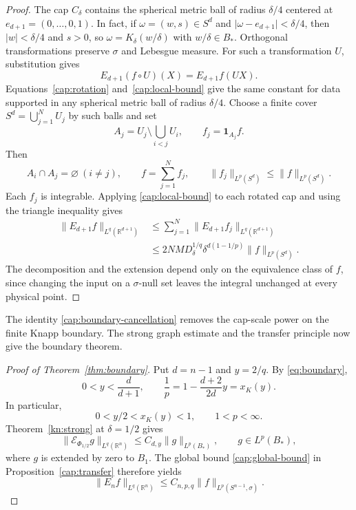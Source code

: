 \documentclass[11pt]{article}
\numberwithin{equation}{section}
\newcommand{\R}{\mathbb{R}}
\newcommand{\norm}[1]{\lVert #1\rVert}
\newcommand{\abs}[1]{\lvert #1\rvert}
\begin{document}
\begin{proof}
The cap $C_\delta$ contains the spherical metric ball of radius
$\delta/4$ centered at $e_{d+1}=(0,\ldots,0,1)$. In fact, if
$\omega=(w,s)\in S^d$ and $\abs{\omega-e_{d+1}}<\delta/4$, then
$\abs{w}<\delta/4$ and $s>0$, so $\omega=K_\delta(w/\delta)$ with
$w/\delta\in B_*$. Orthogonal transformations preserve $\sigma$ and
Lebesgue measure. For such a transformation $U$, substitution gives
\begin{equation}\label{cap:rotation}
 E_{d+1}(f\circ U)(X)=E_{d+1}f(UX).
\end{equation}
Equations~\eqref{cap:rotation} and~\eqref{cap:local-bound} give the same constant for data
supported in any spherical metric ball of radius \(\delta/4\).
Choose a finite cover \(S^d=\bigcup_{j=1}^N U_j\) by such balls and set
\[
 A_j=U_j\setminus\bigcup_{i<j}U_i,\qquad
 f_j=\mathbf1_{A_j}f.
\]
Then
\[
 A_i\cap A_j=\varnothing\ (i\ne j),\qquad
 f=\sum_{j=1}^N f_j,\qquad
 \norm{f_j}_{L^p(S^d)}\le\norm f_{L^p(S^d)}.
\]
Each \(f_j\) is integrable. Applying \eqref{cap:local-bound} to each
rotated cap and using the triangle inequality gives
\begin{equation}\label{cap:global-bound}
 \begin{aligned}
 \norm{E_{d+1}f}_{L^q(\R^{d+1})}
 &\le\sum_{j=1}^N\norm{E_{d+1}f_j}_{L^q(\R^{d+1})}\\
 &\le2NM D_\delta^{1/q}\delta^{d(1-1/p)}\norm f_{L^p(S^d)}.
 \end{aligned}
\end{equation}
The decomposition and the extension depend only on the equivalence
class of $f$, since changing the input on a $\sigma$-null set leaves
the integral unchanged at every physical point.
\end{proof}

The identity \eqref{cap:boundary-cancellation} removes the cap-scale power on the finite Knapp boundary. The strong
graph estimate and the transfer principle now give the boundary theorem.

\begin{proof}[Proof of Theorem~\ref{thm:boundary}]
Put $d=n-1$ and $y=2/q$. By \eqref{eq:boundary},
\[
 0<y<\frac{d}{d+1},\qquad
 \frac1p=1-\frac{d+2}{2d}y=x_K(y).
\]
In particular,
\[
 0<y/2<x_K(y)<1,\qquad 1<p<\infty.
\]
Theorem~\ref{kn:strong} at \(\delta=1/2\) gives
\[
 \norm{\mathcal E_{\Phi_{1/2}}g}_{L^q(\R^n)}
 \le C_{d,y}\norm g_{L^p(B_*)},
 \qquad g\in L^p(B_*),
\]
where \(g\) is extended by zero to \(B_1\).
The global bound \eqref{cap:global-bound} in
Proposition~\ref{cap:transfer} therefore yields
\[
 \norm{E_n f}_{L^q(\R^n)}
 \le C_{n,p,q}\norm f_{L^p(S^{n-1},\sigma)}.
\]
\end{proof}
\end{document}
